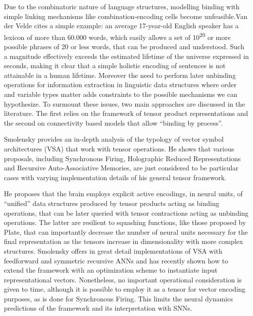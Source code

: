 \documentclass[10pt]{article}
\begin{document}
Due to the combinatoric nature of language structures, modelling binding with simple linking mechanisms like combination-encoding cells 
become unfeasible\cite{von_der_Malsburg_1999}.Van der Velde\cite{van_der_Velde_2006} cites a simple example: an average 17-year-old English speaker has a lexicon of more than 
60.000 words, which easily allows a set of 10\textsuperscript{20} or more possible phrases of 20 or less words, that can be produced and understood.
Such a magnitude effectively exceeds the estimated lifetime of the universe expressed in seconds, 
making it clear that a simple holistic encoding of sentences is not attainable in a human lifetime.
Moreover the need to perform later unbinding operations for information extraction in linguistic data structures where order and variable types matter 
adds constraints to the possible mechanisms we can hypothesize.
To surmount these issues, two main approaches are discussed in the literature.
The first relies on the framework of tensor product representations\cite{smolensky2006harmonic} and 
the second on connectivity based models that allow ``binding by process''\cite{van_der_Velde_2015}.

Smolensky provides an in-depth analysis of the typology of vector symbol architectures (VSA) that work with tensor operations.
He shows that various proposals, including Synchronous Firing\cite{Shastri_1993}, Holographic Reduced Representations\cite{Plate_1995} and Recursive Auto-Associative Memories\cite{Chalmers_1992}, are just considered to be particular cases with varying implementation details of his general tensor framework.

He proposes that the brain employs explicit active encodings, in neural units, of ``unified'' data structures produced by tensor products acting as binding operations, 
that can be later queried with tensor contractions acting as unbinding operations.
The latter are resilient to squashing functions, like those proposed by Plate, that can importantly decrease the number of neural units necessary for the final 
representation as the tensors increase in dimensionality with more complex structures.
Smolensky offers in great detail implementations of VSA with feedforward and symmetric recursive ANNs\cite{smolensky2006harmonic} and has recently shown 
how to extend the framework with an optimization scheme to instantiate input representational vectors\cite{Smolensky_2013}.
Nonetheless, no important operational consideration is given to time, although it is possible to employ it as a tensor for vector encoding purposes, as is done for Synchronous Firing.
This limits the neural dynamics predictions of the framework and its interpretation with SNNs.
\end{document}
